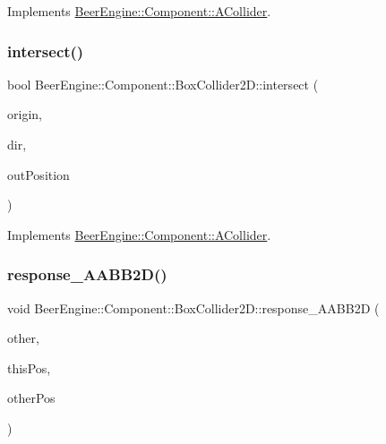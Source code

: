 Implements \mbox{\hyperlink{class_beer_engine_1_1_component_1_1_a_collider_a84f924f6c0631f5f17b4e1852495a505}{Beer\+Engine\+::\+Component\+::\+A\+Collider}}.

\mbox{\label{class_beer_engine_1_1_component_1_1_box_collider2_d_a41f84de78c4441ec2c74a0d3609f2c09}} 
\subsubsection{\texorpdfstring{intersect()}{intersect()}\hspace{0.1cm}{\footnotesize\ttfamily [2/2]}}
{\footnotesize\ttfamily bool Beer\+Engine\+::\+Component\+::\+Box\+Collider2\+D\+::intersect (\begin{DoxyParamCaption}\item[{glm\+::vec2}]{origin,  }\item[{glm\+::vec2}]{dir,  }\item[{glm\+::vec2 \&}]{out\+Position }\end{DoxyParamCaption})\hspace{0.3cm}{\ttfamily [virtual]}}



Implements \mbox{\hyperlink{class_beer_engine_1_1_component_1_1_a_collider_a2ffff777d86ac72aee0c0586ab651db8}{Beer\+Engine\+::\+Component\+::\+A\+Collider}}.

\mbox{\label{class_beer_engine_1_1_component_1_1_box_collider2_d_ab10c2db9816e643482ed59d35b0cff69}} 
\subsubsection{\texorpdfstring{response\+\_\+\+A\+A\+B\+B2\+D()}{response\_AABB2D()}\hspace{0.1cm}{\footnotesize\ttfamily [1/2]}}
{\footnotesize\ttfamily void Beer\+Engine\+::\+Component\+::\+Box\+Collider2\+D\+::response\+\_\+\+A\+A\+B\+B2D (\begin{DoxyParamCaption}\item[{\mbox{\hyperlink{class_beer_engine_1_1_component_1_1_box_collider2_d}{Box\+Collider2D}} $\ast$}]{other,  }\item[{glm\+::vec2 \&}]{this\+Pos,  }\item[{glm\+::vec2 \&}]{other\+Pos }\end{DoxyParamCaption})}

